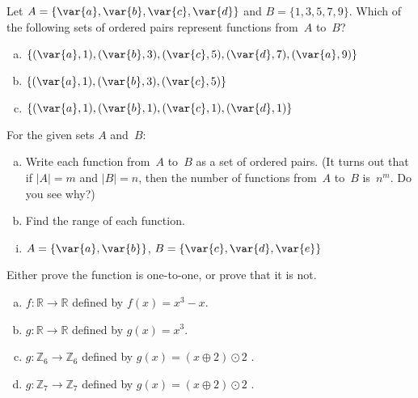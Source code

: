 \begin{exercise}\label{exercise:TestPractice:ExOrderPairs}
Let  $A = \{ \var{a}, \var{b}, \var{c}, \var{d} \}$ and  $B = \{1,3,5,7,9\}$.
Which of the following sets of ordered pairs represent functions from~$A$ to~$B$?

\begin{multicols}{2}
\begin{enumerate}[a.]
\item \label{WhichAreFuncsEx-a1b3c5d7e9a11}
$\{ (\var{a}, 1), (\var{b}, 3), (\var{c}, 5), (\var{d}, 7), (\var{a},9) \}$
\item \label{WhichAreFuncsEx-a1b3c5e7}
$\{ (\var{a}, 1), (\var{b}, 3), (\var{c}, 5) \}$
\item \label{WhichAreFuncsEx-a1b1c1d1e1}
$\{ (\var{a}, 1), (\var{b}, 1), (\var{c}, 1), (\var{d}, 1) \}$
\end{enumerate}
\end{multicols}
\end{exercise}

\begin{exercise}\label{exercise:TestPractice:27}
 For the given sets $A$ and~$B$:
\begin{enumerate}[(a)] 
\item Write each function from~$A$ to~$B$ as a set of ordered pairs. (It turns out that if $|A| = m$
and $|B| = n$, then the number of functions from~$A$ to~$B$ is~$n^m$. Do you see why?)
\item Find the range of each function.
\end{enumerate}
\begin{enumerate}[i.]
\item \label{FunctionsChapExers-FindAll-ab,cde}
$A = \{\var{a},\var{b}\}$, $B = \{\var{c},\var{d},\var{e}\}$
\end{enumerate}
\end{exercise}

\begin{exercise}\label{exercise:TestPractice:11Exers}
Either prove the function is one-to-one, or prove that it is not.
\begin{multicols}{2}
 \begin{enumerate}[(a)]
\item \label{11Exers-formula-f}
 $f \colon {\mathbb R} \to {\mathbb R}$ defined by $f(x) = x^3 - x$.
\item \label{11Exers-formula-g}
 $g \colon {\mathbb R} \to {\mathbb R}$ defined by $g(x) = x^3$.
\item \label{modular_g}
 $g \colon {\mathbb Z}_6 \to {\mathbb Z}_6$ defined by $g(x)= (x \oplus 2) \odot 2$ .
\item \label{modular_g}
 $g \colon {\mathbb Z}_7 \to {\mathbb Z}_7$ defined by $g(x)= (x \oplus 2) \odot 2$ .
\end{enumerate}
\end{multicols}
\end{exercise}

